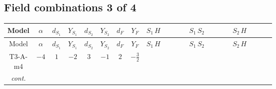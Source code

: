 \documentclass[8pt]{article}
\begin{document}
\begin{landscape}
\subsection*{Field combinations 3 of 4}
\begin{longtable}{@{}cccccccc >{\raggedright\arraybackslash}p{0.21\linewidth} >{\raggedright\arraybackslash}p{0.21\linewidth} >{\raggedright\arraybackslash}p{0.21\linewidth}@{}}
\toprule
Model & $\alpha$ & $d_{S_1}$ & $Y_{S_1}$ & $d_{S_2}$ & $Y_{S_2}$ & $d_F$ & $Y_F$ & $S_1\,H$ & $S_1\,S_2$ & $S_2\,H$ \\
\midrule
\endfirsthead
\toprule
Model & $\alpha$ & $d_{S_1}$ & $Y_{S_1}$ & $d_{S_2}$ & $Y_{S_2}$ & $d_F$ & $Y_F$ & $S_1\,H$ & $S_1\,S_2$ & $S_2\,H$ \\
\midrule
\endhead
T3-A-m4 & $-4$ & $1$ & $-2$ & $3$ & $-1$ & $2$ & $-\frac{3}{2}$ & \scriptsize\adjustbox{max width=\linewidth}{$\begin{gathered} +H_{a_2} S_1 H_{a_1}{}^{\dagger } S_1{}^{\dagger } \mathcal{I}_{H1,a_1,a_2}{}^1 \lambda_{HS_1}^{(1)}^{(1)}\end{gathered}$} & \scriptsize\adjustbox{max width=\linewidth}{$\begin{gathered} +S_1 S_{2,j_2} S_1{}^{\dagger } S_{2,j_1}{}^{\dagger } \mathcal{I}_{12,j_1,j_2}{}^1 \lambda_{12}^{(1)}^{(1)}\end{gathered}$} & \scriptsize\adjustbox{max width=\linewidth}{$\begin{gathered} +\frac{1}{2} H_{a_2} S_{2,j_2} H_{a_1}{}^{\dagger } S_{2,j_1}{}^{\dagger } \mathcal{I}_{H2,a_1,a_2,j_1,j_2}{}^1 \lambda_{HS_2}^{(1)}^{(1)} \\ +\frac{1}{2} H_{a_2} S_{2,j_2} H_{a_1}{}^{\dagger } S_{2,j_1}{}^{\dagger } \mathcal{I}_{H2,a_1,a_2,j_2,j_1}{}^1 \lambda_{HS_2}^{(1)}^{(1)} \\ +\frac{1}{2} H_{a_2} S_{2,j_2} H_{a_1}{}^{\dagger } S_{2,j_1}{}^{\dagger } \mathcal{I}_{H2,a_1,a_2,j_1,j_2}{}^2 \lambda_{HS_2}^{(1)}^{(2)}\end{gathered}$} \\
\textit{cont.} &  &  &  &  &  &  &  &  &  & \scriptsize\adjustbox{max width=\linewidth}{$\begin{gathered} +\frac{1}{2} H_{a_2} S_{2,j_2} H_{a_1}{}^{\dagger } S_{2,j_1}{}^{\dagger } \mathcal{I}_{H2,a_1,a_2,j_2,j_1}{}^2 \lambda_{HS_2}^{(1)}^{(2)}\end{gathered}$} \\
\midrule

\end{longtable}
\end{landscape}
\end{document}
